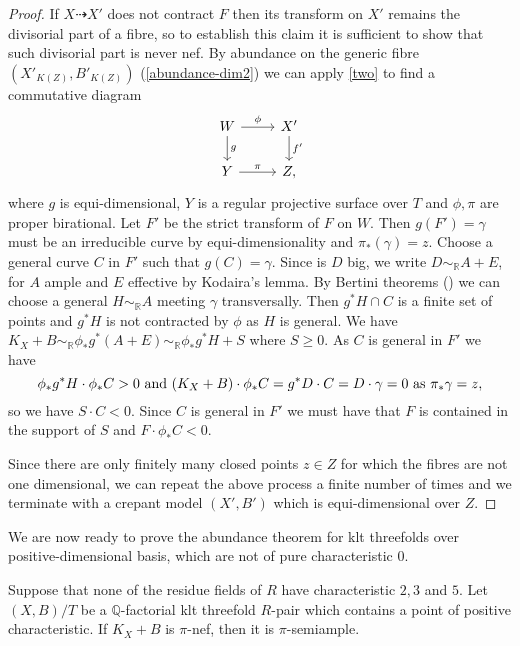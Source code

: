 \begin{proof}
	If $X\dashrightarrow X'$ does not contract $F$ then its transform on $X'$ remains the divisorial part of a fibre, so to establish this claim it is sufficient to show that such divisorial part is never nef. 
	By abundance on the generic fibre $(X'_{K(Z)},B'_{K(Z)})$ (\autoref{abundance-dim2}) we can apply \autoref{two} to find a commutative diagram 
	\[
	\begin{tikzcd}
	W \arrow[d, "g"] \arrow[r, "\phi"] & X' \arrow[d, "f'"]  \\
	Y\arrow[r, "\pi"]           & Z,              
	\end{tikzcd}
	\]
	where $g$ is equi-dimensional, $Y$ is a regular projective surface over $T$ and $\phi, \pi$ are proper birational.
	Let $F'$ be the strict transform of $F$ on $W$. Then $g(F')=\gamma$ must be an irreducible curve by equi-dimensionality and $\pi_*(\gamma)=z$. Choose a general curve $C$ in $F'$ such that $g(C)=\gamma$.
	Since is $D$ big, we write $D\sim_{\mathbb{R}} A+E$, for $A$ ample and $E$ effective by Kodaira's lemma.
	By Bertini theorems (\cite[Theorem 2.15]{bhatt2020}) we can choose a general $H \sim_{\mathbb{R}} A$ meeting $\gamma$ transversally. 
	Then $g^{*}H \cap C$ is a finite set of points and $g^{*}H$ is not contracted by $\phi$ as $H$ is general.
	We have $K_{X}+B \sim_{\mathbb{R}}\phi_{*}g^{*}(A+E) \sim_{\mathbb{R}}\phi_{*}g^{*}H+S$ where $S \geq 0$. As $C$ is general in $F'$ we have
	$$\phi_{*}g^{*}H \cdot \phi_{*}C >0 \textup{ and } (K_{X}+B)\cdot \phi_{*}C=g^{*}D \cdot C=D \cdot \gamma=0 \text{ as } \pi_*\gamma=z,$$ so we have $S \cdot C <0$. Since $C$ is general in $F'$ we must have that $F$ is contained in the support of $S$ and $F \cdot \phi_{*}C <0$.
	
	Since there are only finitely many closed points $z \in Z$ for which the fibres are not one dimensional, we can repeat the above process a finite number of times and we terminate with a crepant model $(X',B')$ which is equi-dimensional over $Z$.	
\end{proof}

We are now ready to prove the abundance theorem for klt threefolds over positive-dimensional basis, which are not of pure characteristic $0$.

\begin{theorem}\label{abundance}
	Suppose that none of the residue fields of $R$ have characteristic $2,3$ and $5$. 
	Let $(X,B)/T$ be a $\mathbb{Q}$-factorial klt threefold $R$-pair which contains a point of positive characteristic. If $K_X+B$ is $\pi$-nef, then it is $\pi$-semiample.
\end{theorem}

